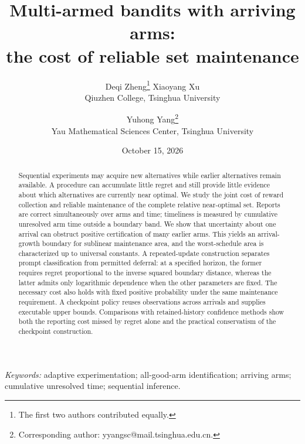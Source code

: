 \documentclass[11pt]{article}
\title{Multi-armed bandits with arriving arms:\\the cost of reliable set maintenance}
\author{}
\author{Deqi Zheng\thanks{The first two authors contributed equally.} \quad
 Xiaoyang Xu\footnotemark[1] \\ Qiuzhen College, Tsinghua University
 \and Yuhong Yang\thanks{Corresponding author: yyangsc@mail.tsinghua.edu.cn.}\\
 Yau Mathematical Sciences Center, Tsinghua University}
\date{October 15, 2026}
\begin{document}
\maketitle
\begin{abstract}
Sequential experiments may acquire new alternatives while earlier alternatives
remain available. A procedure can accumulate little regret and still provide
little evidence about which alternatives are currently near optimal. We study
the joint cost of reward collection and reliable maintenance of the complete
relative near-optimal set. Reports are correct simultaneously over arms and
time; timeliness is measured by cumulative unresolved arm time outside a
boundary band. We show that uncertainty about one arrival can obstruct positive
certification of many earlier arms. This yields an arrival-growth boundary for
sublinear maintenance area, and the worst-schedule area is characterized up to
universal constants. A repeated-update construction separates prompt
classification from permitted deferral: at a specified horizon, the former
requires regret proportional to the inverse squared boundary distance, whereas
the latter admits only logarithmic dependence when the other parameters are
fixed. The necessary cost also holds with fixed positive probability under the
same maintenance requirement. A checkpoint policy reuses observations across
arrivals and supplies executable upper bounds. Comparisons with retained-history
confidence methods show both the reporting cost missed by regret alone and the
practical conservatism of the checkpoint construction.
\end{abstract}
\noindent\textit{Keywords:} adaptive experimentation; all-good-arm identification;
arriving arms; cumulative unresolved time; sequential inference.






\FloatBarrier



\end{document}
